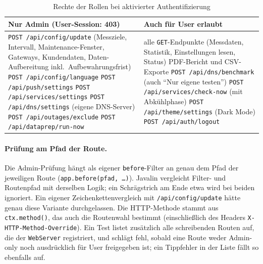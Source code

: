 \begin{table}[H]
\centering
\small
\begin{tabular}{|p{6.3cm}|p{7.7cm}|}
\hline
\textbf{Nur Admin (User-Session: 403)} & \textbf{Auch für User erlaubt} \\
\hline
\raggedright
  \texttt{POST /api/config/update} (Messziele, Intervall, Maintenance-Fenster, Gateways,
  Kundendaten, Daten-Aufbereitung inkl.\ Aufbewahrungsfrist) \newline
  \texttt{POST /api/config/language} \newline
  \texttt{POST /api/push/settings} \newline
  \texttt{POST /api/services/settings} \newline
  \texttt{POST /api/dns/settings} (eigene DNS-Server) \newline
  \texttt{POST /api/outages/exclude} \newline
  \texttt{POST /api/dataprep/run-now}
& \raggedright
  alle \texttt{GET}-Endpunkte (Messdaten, Statistik, Einstellungen lesen, Status) \newline
  PDF-Bericht und CSV-Exporte \newline
  \texttt{POST /api/dns/benchmark} (auch \enquote{Nur eigene testen}) \newline
  \texttt{POST /api/services/check-now} (mit Abkühlphase) \newline
  \texttt{POST /api/theme/settings} (Dark Mode) \newline
  \texttt{POST /api/auth/logout} \tabularnewline
\hline
\end{tabular}
\caption{Rechte der Rollen bei aktivierter Authentifizierung}
\label{tab:rollen}
\end{table}

\paragraph{Prüfung am Pfad der Route.} Die Admin-Prüfung hängt als eigener
\texttt{before}-Filter an genau dem Pfad der jeweiligen Route
(\texttt{app.before(pfad, \dots)}). Javalin vergleicht Filter- und Routenpfad mit
derselben Logik; ein Schrägstrich am Ende etwa wird bei beiden ignoriert. Ein eigener
Zeichenkettenvergleich mit \texttt{/api/config/update} hätte genau diese Variante
durchgelassen. Die HTTP-Methode stammt aus \texttt{ctx.method()}, das auch die Routenwahl
bestimmt (einschließlich des Headers \texttt{X-HTTP-Method-Override}). Ein Test listet
zusätzlich alle schreibenden Routen auf, die der \texttt{WebServer} registriert, und
schlägt fehl, sobald eine Route weder Admin-only noch ausdrücklich für User freigegeben
ist; ein Tippfehler in der Liste fällt so ebenfalls auf.


